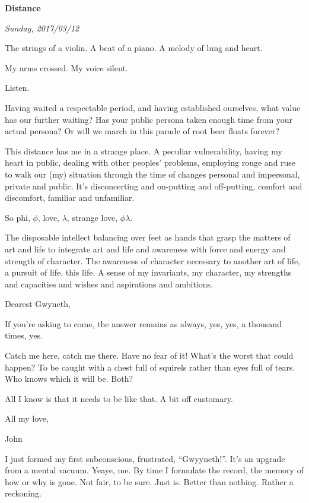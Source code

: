 

\centerline{\bf Distance}
\centerline{\it Sunday, 2017/03/12}



\break

﻿The strings of a violin.  A beat of a piano.  A melody of lung and
heart.

My arms crossed.  My voice silent.  

Listen.

\break

﻿Having waited a respectable period, and having established ourselves,
what value has our further waiting?  Has your public persona taken
enough time from your actual persona?  Or will we march in this parade
of root beer floats forever?

\break

﻿This distance has me in a strange place.  A peculiar vulnerability,
having my heart in public, dealing with other peoples' problems,
employing rouge and ruse to walk our (my) situation through the time
of changes personal and impersonal, private and public.  It's
disconcerting and on-putting and off-putting, comfort and discomfort,
familiar and unfamiliar.

So phi, $\phi$, love, $\lambda$, strange love, $\phi\lambda$.  

The disposable intellect balancing over feet as hands that grasp the
matters of art and life to integrate art and life and awareness with
force and energy and strength of character.  The awareness of
character necessary to another art of life, a pursuit of life, this
life.  A sense of my invariants, my character, my strengths and
capacities and wishes and aspirations and ambitions.

\break

﻿Dearest Gwyneth,

If you're asking to come, the answer remains as always, yes, yes, a
thousand times, yes.

Catch me here, catch me there.  Have no fear of it!  What's the worst
that could happen?  To be caught with a chest full of squirels rather
than eyes full of tears.  Who knows which it will be.  Both?

All I know is that it needs to be like that.  A bit off customary.

All my love,

John

\break


I just formed my first subconscious, frustrated, ``Gwyyneth!''.  It's an
upgrade from a mental vacuum.  Yeaye, me.  By time I formulate the
record, the memory of how or why is gone.  Not fair, to be sure.  Just
is.  Better than nothing.  Rather a reckoning.

\bye
